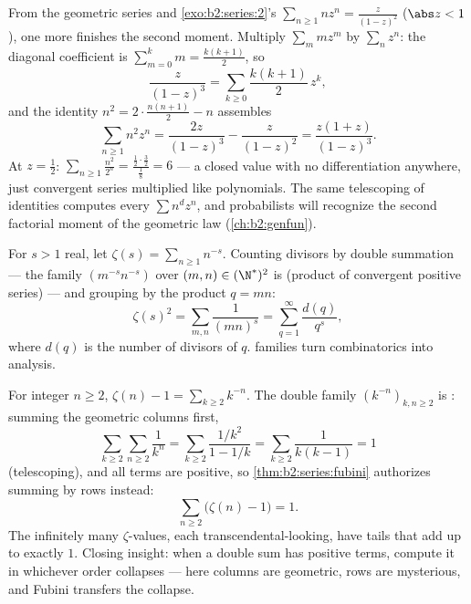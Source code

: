 \begin{example}\label{ex:b2:series:squaresum}
From the geometric series and \cref{exo:b2:series:2}'s $\sum_{n
\geq 1} nz^n = \frac{z}{(1-z)^2}$ ($\abs z < 1$), one more
 finishes the second moment. Multiply $\sum_m
mz^m$ by $\sum_n z^n$: the diagonal coefficient is $\sum_{m=0}^k
m = \frac{k(k+1)}2$, so
\[
\frac{z}{(1-z)^3} = \sum_{k\geq0}\frac{k(k+1)}{2}\,z^k ,
\]
and the identity $n^2 = 2\cdot\frac{n(n+1)}2 - n$ assembles
\[
\sum_{n\geq1} n^2z^n = \frac{2z}{(1-z)^3} - \frac{z}{(1-z)^2}
= \frac{z(1+z)}{(1-z)^3} .
\]
At $z = \frac12$: $\sum_{n\geq1}\frac{n^2}{2^n} =
\frac{\frac12\cdot\frac32}{\frac18} = 6$ --- a closed value with
no differentiation anywhere, just  convergent series
multiplied like polynomials. The same telescoping of identities
computes every $\sum n^dz^n$, and probabilists will recognize
the second factorial moment of the geometric law
(\cref{ch:b2:genfun}).
\end{example}

\begin{example}\label{ex:b2:series:doublesum}
For $s > 1$ real, let $\zeta(s) = \sum_{n\geq1} n^{-s}$. Counting
divisors by double summation --- the family $(m^{-s}n^{-s})$ over
$(m,n) \in (\N^*)^2$ is  (product of convergent positive
series) --- and grouping by the product $q = mn$:
\[
\zeta(s)^2 = \sum_{m,n} \frac{1}{(mn)^s}
= \sum_{q=1}^{\infty} \frac{d(q)}{q^s},
\]
where $d(q)$ is the number of divisors of $q$.  families
turn combinatorics into analysis.
\end{example}

\begin{example}[A Fubini evaluation: $\sum_n (\zeta(n) - 1) = 1$]\label{ex:b2:series:zetasum}
For integer $n \geq 2$, $\zeta(n) - 1 = \sum_{k \geq 2} k^{-n}$.
The double family $(k^{-n})_{k, n \geq 2}$ is : summing
the geometric columns first,
\[
\sum_{k\geq2}\sum_{n\geq2} \frac{1}{k^n}
= \sum_{k\geq2} \frac{1/k^2}{1 - 1/k}
= \sum_{k\geq2} \frac{1}{k(k-1)} = 1
\]
(telescoping), and all terms are positive, so
\cref{thm:b2:series:fubini} authorizes summing by rows instead:
\[
\sum_{n\geq2}\bigl(\zeta(n) - 1\bigr) = 1 .
\]
The infinitely many $\zeta$-values, each transcendental-looking,
have tails that add up to exactly $1$. Closing insight: when a
double sum has positive terms, compute it in whichever order
collapses --- here columns are geometric, rows are mysterious,
and Fubini transfers the collapse.
\end{example}

